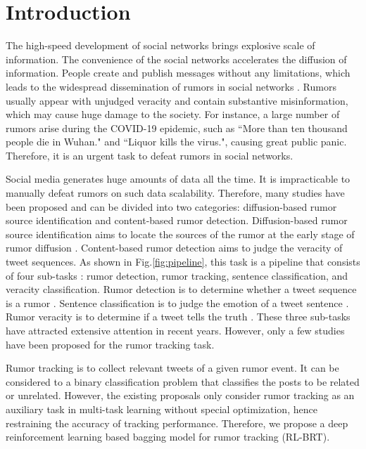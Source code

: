 \section{Introduction}
\label{sec:introduction}
The high-speed development of social networks brings explosive scale of information. The convenience of the social networks accelerates the diffusion of information. People create and publish messages without any limitations, which leads to the widespread dissemination of rumors in social networks \cite{DBLP:journals/corr/KurkaGZ15, DBLP:journals/csur/ZubiagaABLP18, DBLP:conf/sirocco/KostkaOW08, vosoughi2018spread}. Rumors usually appear with unjudged veracity and contain substantive misinformation, which may cause huge damage to the society. For instance, a large number of rumors arise during the COVID-19 epidemic, such as ``More than ten thousand people die in Wuhan." and ``Liquor kills the virus.", causing great public panic. Therefore, it is an urgent task to defeat rumors in social networks.

Social media generates huge amounts of data all the time. It is impracticable to manually defeat rumors on such data scalability. Therefore, many studies have been proposed and can be divided into two categories: diffusion-based rumor source identification and content-based rumor detection. Diffusion-based rumor source identification aims to locate the sources of the rumor at the early stage of rumor diffusion \cite{DBLP:conf/sigmetrics/ShahZ10, DBLP:journals/tit/ShahZ11, DBLP:conf/kdd/LappasTGM10}. Content-based rumor detection aims to judge the veracity of tweet sequences. As shown in Fig.\ref{fig:pipeline}, this task is a pipeline that consists of four sub-tasks \cite{DBLP:journals/csur/ZubiagaABLP18, DBLP:conf/coling/KochkinaLZ18}: rumor detection, rumor tracking, sentence classification, and veracity classification. Rumor detection is to determine whether a tweet sequence is a rumor  \cite{DBLP:conf/socinfo/ZubiagaLP17, DBLP:conf/www/Ma0W19,DBLP:conf/naacl/NguyenDCD19, DBLP:journals/corr/abs-1906-05659}. Sentence classification is to judge the emotion of a tweet sentence \cite{DBLP:conf/semeval/EnayetE17, DBLP:conf/semeval/X17a, DBLP:conf/coling/ZubiagaKLPL16}. Rumor veracity is to determine if a tweet tells the truth \cite{DBLP:conf/coling/KochkinaLZ18, DBLP:conf/acl/LiZS19, DBLP:conf/acl/KumarC19}. These three sub-tasks have attracted extensive attention in recent years. However, only a few studies have been proposed for the rumor tracking task.

Rumor tracking is to collect relevant tweets of a given rumor event. It can be considered to a binary classification problem that classifies the posts to be related or unrelated. However, the existing proposals \cite{DBLP:conf/emnlp/QazvinianRRM11, DBLP:conf/www/ChengNB20}  only consider rumor tracking as an auxiliary task in multi-task learning without special optimization, hence restraining the accuracy of tracking performance.
Therefore, we propose a deep reinforcement learning based bagging model for rumor tracking (RL-BRT).

